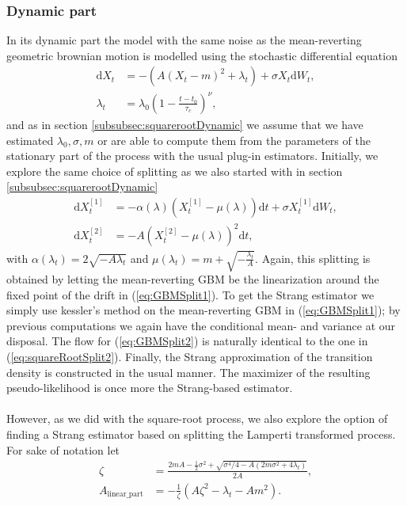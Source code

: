 \subsubsection{Dynamic part}\label{subsubsec:meanrevertingGBMDynamic}
In its dynamic part the model with the same noise as the mean-reverting geometric brownian motion is modelled using the stochastic differential equation
\begin{align}
    \mathrm{d}X_t &= -\left(A\left(X_t - m\right)^2 + \lambda_t\right) + \sigma X_t \mathrm{d}W_t, \label{eq:GBM_dynamic_SDE}\\
    \lambda_t &= \lambda_0\left(1 - \frac{t - t_0}{\tau_c}\right)^\nu,
\end{align}
and as in section \ref{subsubsec:squarerootDynamic} we assume that we have estimated $\lambda_0, \sigma, m$ or are able to compute them from the parameters of the stationary part of the process with the usual plug-in estimators. Initially, we explore the same choice of splitting as we also started with in section \ref{subsubsec:squarerootDynamic}
\begin{align}
    \mathrm{d}X_t^{[1]} &= -\alpha(\lambda)\left(X_t^{[1]} - \mu(\lambda)\right)  \mathrm{d}t + \sigma X_t^{[1]} \mathrm{d}W_t, \label{eq:GBMSplit1} \\
    \mathrm{d}X_t^{[2]} &= - A \left(X_t^{[2]} - \mu(\lambda)\right)^2 \mathrm{d}t, \label{eq:GBMSplit2}
\end{align}
with $\alpha(\lambda_t) = 2\sqrt{-A\lambda_t}$ and $\mu(\lambda_t) = m + \sqrt{-\frac{\lambda_t}{A}}$.
Again, this splitting is obtained by letting the mean-reverting GBM be the linearization around the fixed point of the drift in (\ref{eq:GBMSplit1}). To get the Strang estimator we simply use kessler's method on the mean-reverting GBM in (\ref{eq:GBMSplit1}); by previous computations we again have the conditional mean- and variance at our disposal. The flow for (\ref{eq:GBMSplit2}) is naturally identical to the one in (\ref{eq:squareRootSplit2}). Finally, the Strang approximation of the transition density is constructed in the usual manner. The maximizer of the resulting pseudo-likelihood is once more the Strang-based estimator.\\\\
However, as we did with the square-root process, we also explore the option of finding a Strang estimator based on splitting the Lamperti transformed process. For sake of notation let
\begin{align}
    \zeta &= \frac{2mA - \frac{1}{2}\sigma^2 + \sqrt{\sigma^4/4 - A\left(2m\sigma^2 + 4\lambda_t\right)}}{2A},\\
    A_{\mathrm{linear\_part}} &= - \frac{1}{\zeta}\left(A \zeta^2 - \lambda_t - Am^2\right).
\end{align}

